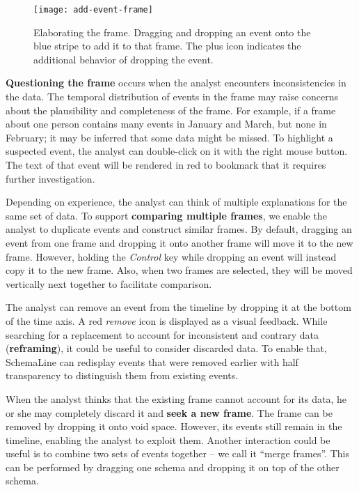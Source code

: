 \begin{figure}
	\centering
	\texttt{[image: add-event-frame]}
	\caption[Elaborating the frame]{Elaborating the frame. Dragging and dropping an event onto the blue stripe to add it to that frame. The plus icon indicates the additional behavior of dropping the event.}
	\label{fig:add-event-frame}
\end{figure}

\textbf{Questioning the frame} occurs when the analyst encounters inconsistencies in the data. The temporal distribution of events in the frame may raise concerns about the plausibility and completeness of the frame. For example, if a frame about one person contains many events in January and March, but none in February; it may be inferred that some data might be missed. To highlight a suspected event, the analyst can double-click on it with the right mouse button. The text of that event will be rendered in red to bookmark that it requires further investigation.

Depending on experience, the analyst can think of multiple explanations for the same set of data. To support \textbf{comparing multiple frames}, we enable the analyst to duplicate events and construct similar frames. By default, dragging an event from one frame and dropping it onto another frame will move it to the new frame. However, holding the \emph{Control} key while dropping an event will instead copy it to the new frame. Also, when two frames are selected, they will be moved vertically next together to facilitate comparison.

The analyst can remove an event from the timeline by dropping it at the bottom of the time axis. A red \emph{remove} icon is displayed as a visual feedback. While searching for a replacement to account for inconsistent and contrary data (\textbf{reframing}), it could be useful to consider discarded data. To enable that, SchemaLine can redisplay events that were removed earlier with half transparency to distinguish them from existing events.

When the analyst thinks that the existing frame cannot account for its data, he or she may  completely discard it and \textbf{seek a new frame}. The frame can be removed by dropping it onto void space. However, its events still remain in the timeline, enabling the analyst to exploit them. Another interaction could be useful is to combine two sets of events together -- we call it ``merge frames''. This can be performed by dragging one schema and dropping it on top of the other schema.